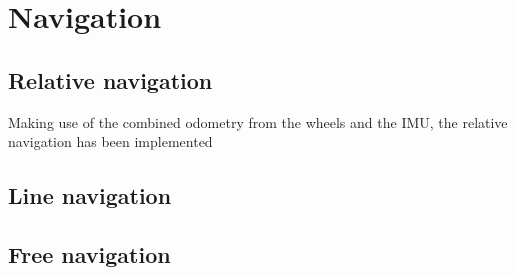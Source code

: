 \section{Navigation} %
\label{sec:mr_navigation}


    \subsection{Relative navigation} %
    \label{sub:mr_relative_navigation}
    Making use of the combined odometry from the wheels and the IMU, the relative navigation has been implemented



    \subsection{Line navigation} %
    \label{sub:mr_line_navigation}
    



    \subsection{Free navigation} %
    \label{sub:mr_free_navigation}
    
